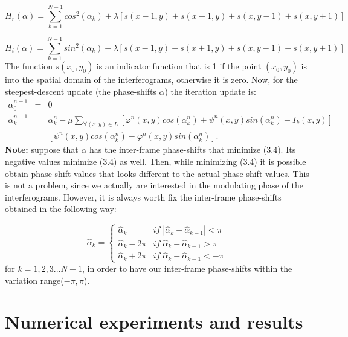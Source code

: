 \begin{equation}
H_{r}(\alpha)=\sum_{k=1}^{N-1}cos^{2}(\alpha_{k})+\lambda[s(x-1,y)+s(x+1,y)+s(x,
y-1)+s(x,y+1)]
\end{equation}


\begin{equation}
H_{i}(\alpha)=\sum_{k=1}^{N-1}sin^{2}(\alpha_{k})+\lambda[s(x-1,y)+s(x+1,y)+s(x,
y-1)+s(x,y+1)]
\end{equation}
The function $s(x_{0},y_{0})$ is an indicator function that is 1
if the point $(x_{0},y_{0})$ is into the spatial domain of the interferograms,
otherwise it is zero. Now, for the steepest-descent update (the phase-shifts
$\alpha$) the iteration update is:
\begin{eqnarray}
\alpha_{0}^{n+1} & = & 0\\
\alpha_{k}^{n+1} & = & \alpha_{k}^{n}-\mu\sum_{\forall(x,y)\in L}[\varphi^{n}(x,
y)cos(\alpha_{k}^{n})+\psi^{n}(x,y)sin(\alpha_{k}^{n})-I_{k}(x,y)]\nonumber \\
 &  & [\psi^{n}(x,y)cos(\alpha_{k}^{n})-\varphi^{n}(x,y)sin(\alpha_{k}^{n})].
\end{eqnarray}
\textbf{Note:} suppose that $\alpha$ has the inter-frame phase-shifts
that minimize (3.4). Its negative values minimize (3.4) as well. Then,
while minimizing (3.4) it is possible obtain phase-shift values that
looks different to the actual phase-shift values. This is not a problem,
since we actually are interested in the modulating phase of the interferograms.
However, it is always worth fix the inter-frame phase-shifts obtained
in the following way:

\begin{equation}
\widehat{\alpha}_{k}=\begin{cases}
\widehat{\alpha}_{k} & if\;|\widehat{\alpha}_{k}-\widehat{\alpha}_{k-1}|<\pi\\
\widehat{\alpha}_{k}-2\pi &
if\;\widehat{\alpha}_{k}-\widehat{\alpha}_{k-1}>\pi\\
\widehat{\alpha}_{k}+2\pi & if\;\widehat{\alpha}_{k}-\widehat{\alpha}_{k-1}<-\pi
\end{cases}
\end{equation}
for $k=1,2,3...N-1$, in order to have our inter-frame
phase-shifts within the variation range($-\pi,\pi$).


\section{Numerical experiments and results}

